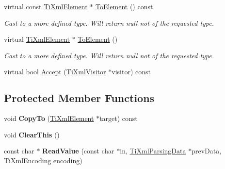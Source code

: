 \begin{DoxyCompactItemize}
\item 
\hypertarget{class_ti_xml_element_ac5b8d0e25fa23fd9acbb6d146082901c}{
virtual const \hyperlink{class_ti_xml_element}{TiXmlElement} $\ast$ \hyperlink{class_ti_xml_element_ac5b8d0e25fa23fd9acbb6d146082901c}{ToElement} () const }
\label{class_ti_xml_element_ac5b8d0e25fa23fd9acbb6d146082901c}

\begin{DoxyCompactList}\small\item\em Cast to a more defined type. Will return null not of the requested type. \end{DoxyCompactList}\item 
\hypertarget{class_ti_xml_element_a9def86337ea7a755eb41cac980f60c7a}{
virtual \hyperlink{class_ti_xml_element}{TiXmlElement} $\ast$ \hyperlink{class_ti_xml_element_a9def86337ea7a755eb41cac980f60c7a}{ToElement} ()}
\label{class_ti_xml_element_a9def86337ea7a755eb41cac980f60c7a}

\begin{DoxyCompactList}\small\item\em Cast to a more defined type. Will return null not of the requested type. \end{DoxyCompactList}\item 
virtual bool \hyperlink{class_ti_xml_element_a31ab28cc3b892a69254391d6bbe08df3}{Accept} (\hyperlink{class_ti_xml_visitor}{TiXmlVisitor} $\ast$visitor) const 
\end{DoxyCompactItemize}
\subsection*{Protected Member Functions}
\begin{DoxyCompactItemize}
\item 
\hypertarget{class_ti_xml_element_a9e0c1983b840de4134f1f6bf7af00b0f}{
void {\bfseries CopyTo} (\hyperlink{class_ti_xml_element}{TiXmlElement} $\ast$target) const }
\label{class_ti_xml_element_a9e0c1983b840de4134f1f6bf7af00b0f}

\item 
\hypertarget{class_ti_xml_element_a5670933ec2d7d9763b9891acc05d7f7d}{
void {\bfseries ClearThis} ()}
\label{class_ti_xml_element_a5670933ec2d7d9763b9891acc05d7f7d}

\item 
\hypertarget{class_ti_xml_element_ac786bce103042d3837c4cc2ff6967d41}{
const char $\ast$ {\bfseries ReadValue} (const char $\ast$in, \hyperlink{class_ti_xml_parsing_data}{TiXmlParsingData} $\ast$prevData, TiXmlEncoding encoding)}
\label{class_ti_xml_element_ac786bce103042d3837c4cc2ff6967d41}

\end{DoxyCompactItemize}


